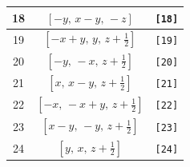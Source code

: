 \documentclass[fleqn,8pt]{jsarticle}
\begin{document}
\begin{longtable}{ccc}
18 & $\left[ - y,\, x - y,\, - z \right]$ & {\tt [18]} \\ \hline
19 & $\left[ - x + y,\, y,\, z + \frac{1}{2} \right]$ & {\tt [19]} \\ \hline
20 & $\left[ - y,\, - x,\, z + \frac{1}{2} \right]$ & {\tt [20]} \\ \hline
21 & $\left[ x,\, x - y,\, z + \frac{1}{2} \right]$ & {\tt [21]} \\ \hline
22 & $\left[ - x,\, - x + y,\, z + \frac{1}{2} \right]$ & {\tt [22]} \\ \hline
23 & $\left[ x - y,\, - y,\, z + \frac{1}{2} \right]$ & {\tt [23]} \\ \hline
24 & $\left[ y,\, x,\, z + \frac{1}{2} \right]$ & {\tt [24]} \\
\end{longtable}
\end{document}

